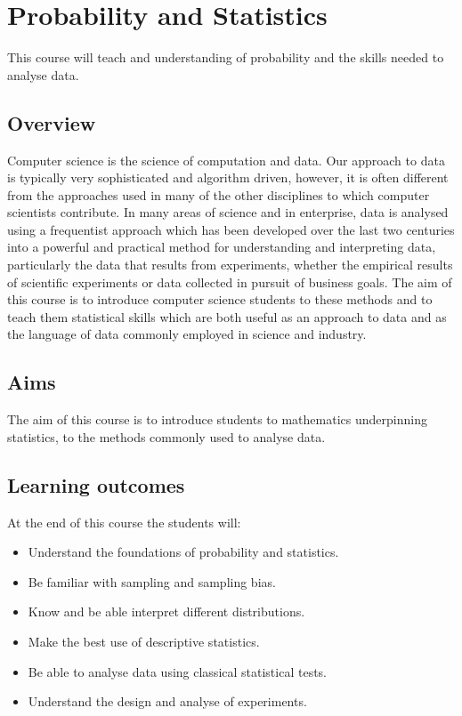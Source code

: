\documentclass[12pt,a4paper]{scrartcl}
\begin{document}
\section*{Probability and Statistics}
This course will teach and understanding of probability and the skills
needed to analyse data.

\subsection*{Overview}

Computer science is the science of computation and data. Our approach
to data is typically very sophisticated and algorithm driven, however,
it is often different from the approaches used in many of the other
disciplines to which computer scientists contribute. In many areas of
science and in enterprise, data is analysed using a frequentist
approach which has been developed over the last two centuries into a
powerful and practical method for understanding and interpreting data,
particularly the data that results from experiments, whether the
empirical results of scientific experiments or data collected in
pursuit of business goals. The aim of this course is to introduce
computer science students to these methods and to teach them
statistical skills which are both useful as an approach to data and as
the language of data commonly employed in science and industry.

\subsection*{Aims}

The aim of this course is to introduce students to mathematics
underpinning statistics, to the methods commonly used to analyse data.

\subsection*{Learning outcomes}

At the end of this course the students will:
\begin{itemize}
\item Understand the foundations of probability and statistics.
\item Be familiar with sampling and sampling bias.
\item Know and be able interpret different distributions.
\item Make the best use of descriptive statistics.
\item Be able to analyse data using classical statistical tests.
\item Understand the design and analyse of experiments.
\end{itemize}
\end{document}
